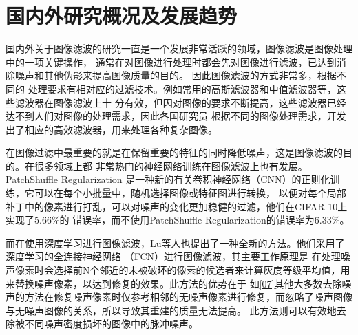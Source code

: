 %
%
%
%

\section{国内外研究概况及发展趋势}
国内外关于图像滤波的研究一直是一个发展非常活跃的领域，图像滤波是图像处理中的一项关键操作，
通常在对图像进行处理时都会先对图像进行滤波，已达到消除噪声和其他伪影来提高图像质量的目的。
因此图像滤波的方式非常多，根据不同的
处理要求有相对应的过滤技术。例如常用的高斯滤波器和中值滤波器等，这些滤波器在图像滤波上十
分有效，但因对图像的要求不断提高，这些滤波器已经达不到人们对图像的处理需求，因此各国研究员
根据不同的图像处理需求，开发出了相应的高效滤波器，用来处理各种复杂图像。

在图像过滤中最重要的就是在保留重要的特征的同时降低噪声，这是图像滤波的目的。在很多领域上都
非常热门的神经网络训练在图像滤波上也有发展。PatchShuffle Regularization\cite{kangPatchShuffleRegularization2017}
是一种新的有关卷积神经网络（CNN）的正则化训练，它可以在每个小批量中，随机选择图像或特征图进行转换，
以便对每个局部补丁中的像素进行打乱，可以对噪声的变化更加稳健的过滤，他们在CIFAR-10上实现了5.66\%的
错误率，而不使用PatchShuffle Regularization的错误率为6.33\%。

而在使用深度学习进行图像滤波，Lu\cite{luImageEnhancementUsing2021}等人也提出了一种全新的方法。他们采用了深度学习的全连接神经网络
（FCN）进行图像滤波，其主要工作原理是
在处理噪声像素时会选择前N个邻近的未被破环的像素的候选者来计算灰度等级平均值，用来替换噪声像素，以达到修复的效果。此方法的优势在于
如\ref{07}其他大多数去除噪声的方法在修复噪声像素时仅参考相邻的无噪声像素进行修复，而忽略了噪声图像与无噪声图像的关系，所以导致其重建的质量无法提高。
此方法则可以有效地去除被不同噪声密度损坏的图像中的脉冲噪声。

